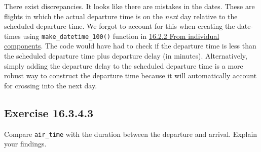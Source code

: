 \documentclass[]{book}
\newenvironment{Shaded}{\begin{snugshade}}{\end{snugshade}}
\newcommand{\CommentTok}[1]{\textcolor[rgb]{0.56,0.35,0.01}{\textit{#1}}}
\newcommand{\DataTypeTok}[1]{\textcolor[rgb]{0.13,0.29,0.53}{#1}}
\newcommand{\KeywordTok}[1]{\textcolor[rgb]{0.13,0.29,0.53}{\textbf{#1}}}
\newcommand{\NormalTok}[1]{#1}
\newcommand{\OperatorTok}[1]{\textcolor[rgb]{0.81,0.36,0.00}{\textbf{#1}}}
\newcommand{\StringTok}[1]{\textcolor[rgb]{0.31,0.60,0.02}{#1}}
\theoremstyle{plain}
\theoremstyle{remark}
\begin{document}
There exist discrepancies. It looks like there are mistakes in the
dates. These are flights in which the actual departure time is on the
\emph{next} day relative to the scheduled departure time. We forgot to
account for this when creating the date-times using
\texttt{make\_datetime\_100()} function in
\href{https://r4ds.had.co.nz/dates-and-times.html\#from-individual-components}{16.2.2
From individual components}. The code would have had to check if the
departure time is less than the scheduled departure time plus departure
delay (in minutes). Alternatively, simply adding the departure delay to
the scheduled departure time is a more robust way to construct the
departure time because it will automatically account for crossing into
the next day.

\hypertarget{exercise-16.3.4.3}{%
\subsection*{\texorpdfstring{Exercise
{16.3.4.3}}{Exercise 16.3.4.3}}\label{exercise-16.3.4.3}}

Compare \texttt{air\_time} with the duration between the departure and
arrival. Explain your findings.

\begin{Shaded}
\end{Shaded}
\end{document}
